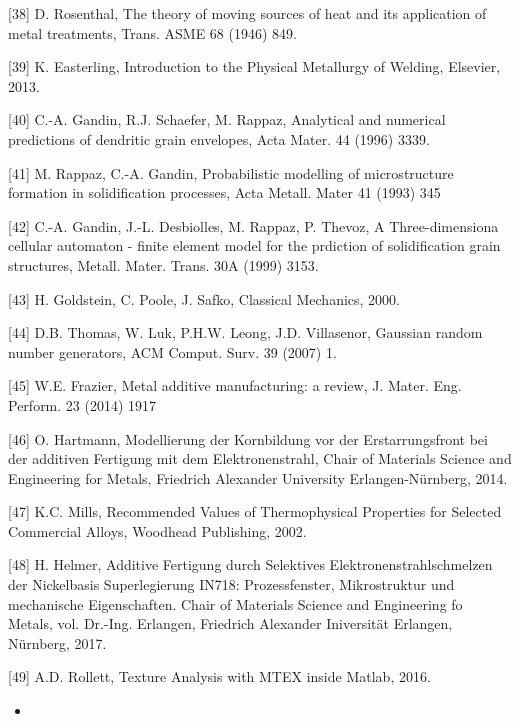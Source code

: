 \documentclass[10pt]{article}
\begin{document}
[38] D. Rosenthal, The theory of moving sources of heat and its application of metal treatments, Trans. ASME 68 (1946) 849.

[39] K. Easterling, Introduction to the Physical Metallurgy of Welding, Elsevier, 2013.

[40] C.-A. Gandin, R.J. Schaefer, M. Rappaz, Analytical and numerical predictions of dendritic grain envelopes, Acta Mater. 44 (1996) 3339.

[41] M. Rappaz, C.-A. Gandin, Probabilistic modelling of microstructure formation in solidification processes, Acta Metall. Mater 41 (1993) 345

[42] C.-A. Gandin, J.-L. Desbiolles, M. Rappaz, P. Thevoz, A Three-dimensiona cellular automaton - finite element model for the prdiction of solidification grain structures, Metall. Mater. Trans. 30A (1999) 3153.

[43] H. Goldstein, C. Poole, J. Safko, Classical Mechanics, 2000.

[44] D.B. Thomas, W. Luk, P.H.W. Leong, J.D. Villasenor, Gaussian random number generators, ACM Comput. Surv. 39 (2007) 1.

[45] W.E. Frazier, Metal additive manufacturing: a review, J. Mater. Eng. Perform. 23 (2014) 1917

[46] O. Hartmann, Modellierung der Kornbildung vor der Erstarrungsfront bei der additiven Fertigung mit dem Elektronenstrahl, Chair of Materials Science and Engineering for Metals, Friedrich Alexander University Erlangen-Nürnberg, 2014.

[47] K.C. Mills, Recommended Values of Thermophysical Properties for Selected Commercial Alloys, Woodhead Publishing, 2002.

[48] H. Helmer, Additive Fertigung durch Selektives Elektronenstrahlschmelzen der Nickelbasis Superlegierung IN718: Prozessfenster, Mikrostruktur und mechanische Eigenschaften. Chair of Materials Science and Engineering fo Metals, vol. Dr.-Ing. Erlangen, Friedrich Alexander Iniversität Erlangen, Nürnberg, 2017.

[49] A.D. Rollett, Texture Analysis with MTEX inside Matlab, 2016.

\begin{itemize}
  \item 
\end{itemize}
\end{document}
